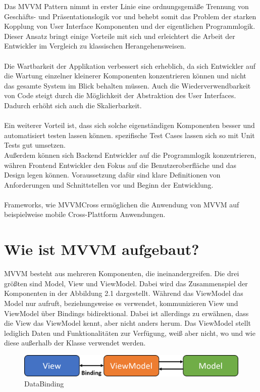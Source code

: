 \documentclass[titlepage=false,12pt]{scrreprt}
\begin{document}
Das MVVM Pattern nimmt in erster Linie eine ordnungsgemäße Trennung von Geschäfts- und Präsentationslogik vor und
behebt somit das Problem der starken Kopplung von User Interface Komponenten und der eigentlichen Programmlogik.
Dieser Ansatz bringt einige Vorteile mit sich und erleichtert die Arbeit der Entwickler im Vergleich zu klassischen
Herangehensweisen.\\
\\
Die Wartbarkeit der Applikation verbessert sich erheblich, da sich Entwickler auf die Wartung einzelner kleinerer
Komponenten konzentrieren können und nicht das gesamte System im Blick behalten müssen. Auch die Wiederverwendbarkeit
von Code steigt durch die Möglichkeit der Abstraktion des User Interfaces. Dadurch erhöht sich auch die Skalierbarkeit.\\
\\
Ein weiterer Vorteil ist, dass sich solche eigenständigen Komponenten besser und automatisiert testen lassen können.
spezifische Test Cases lassen sich so mit Unit Tests gut umsetzen.
\\
Außerdem können sich Backend Entwickler auf die Programmlogik konzentrieren, währen Frontend Entwickler den Fokus
auf die Benutzeroberfläche und das Design legen können. Voraussetzung dafür sind klare Definitionen von
Anforderungen und Schnittstellen vor und Beginn der Entwicklung.\\
\\
Frameworks, wie MVVMCross ermöglichen die Anwendung von MVVM auf beispielweise mobile Cross-Plattform Anwendungen.

\chapter{Wie ist MVVM aufgebaut?}

MVVM besteht aus mehreren Komponenten, die ineinandergreifen. Die drei 
größten sind Model, View und ViewModel. Dabei wird das Zusammenspiel 
der Komponenten in der Abbildung 2.1 dargestellt. Während das ViewModel das Model
nur aufruft, beziehungsweise es verwendet, kommunizieren View und ViewModel über
Bindings bidirektional. Dabei ist allerdings zu erwähnen, dass die View das ViewModel
kennt, aber nicht anders herum. Das ViewModel stellt lediglich Daten und Funktionalitäten
zur Verfügung, weiß aber nicht, wo und wie diese außerhalb der Klasse verwendet werden.

\begin{figure}[h]
	\includegraphics[width=\textwidth]{MVVM.png}
	\caption[]{DataBinding}
\end{figure}
\end{document}
